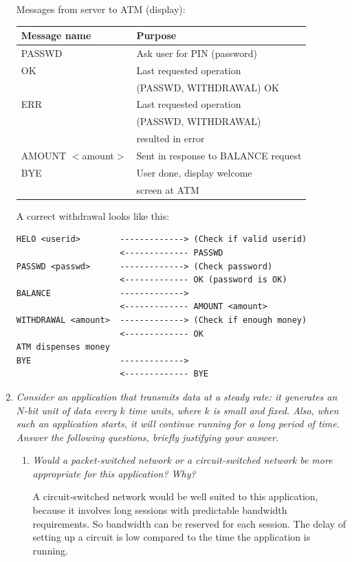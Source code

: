 \documentclass[11pt,a4paper]{article}
\begin{document}
\begin{enumerate}
  Messages from server to ATM (display):

  \begin{tabular}{l|l}
  Message name & Purpose\\
  \hline \hline
  PASSWD  & Ask user for PIN (password)\\
  OK      & Last requested operation\\
          & (PASSWD, WITHDRAWAL) OK\\
  ERR     & Last requested operation\\
          & (PASSWD, WITHDRAWAL)\\
          & resulted in error\\
  AMOUNT \(<\)amount\(>\) & Sent in response to
                            BALANCE request\\
  BYE     & User done, display welcome\\
          & screen at ATM
  \end{tabular}

  A correct withdrawal looks like this:
{\small
  \begin{verbatim}
HELO <userid>        -------------> (Check if valid userid)
                     <------------- PASSWD
PASSWD <passwd>      -------------> (Check password)
                     <------------- OK (password is OK)
BALANCE              ------------->
                     <------------- AMOUNT <amount>
WITHDRAWAL <amount>  -------------> (Check if enough money)
                     <------------- OK
ATM dispenses money
BYE                  ------------->
                     <------------- BYE
  \end{verbatim}
}

  \item \emph{Consider an application that transmits data at a steady
  rate: it generates an \(N\)-bit unit of data every \(k\) time units,
  where \(k\) is small and fixed. Also, when such an application
  starts, it will continue running for a long period of time. Answer
  the following questions, briefly justifying your answer.}

  \begin{enumerate}

    \item \emph{Would a packet-switched network or a circuit-switched
    network be more appropriate for this application? Why?}

    A circuit-switched network would be well suited to this
    application, because it involves long sessions with predictable
    bandwidth requirements. So bandwidth can be reserved for each
    session. The delay of setting up a circuit is low compared to the
    time the application is running.


\end{enumerate}
\end{enumerate}
\end{document}
